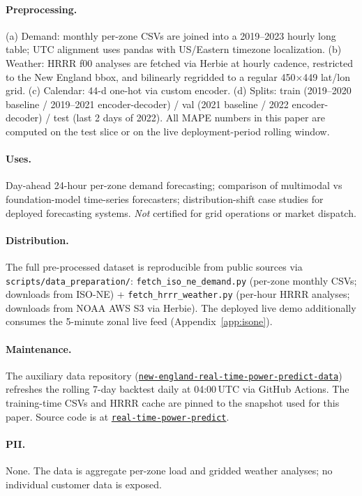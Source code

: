 \paragraph{Preprocessing.} (a) Demand: monthly per-zone CSVs are joined into a 2019--2023 hourly long table; UTC alignment uses pandas with US/Eastern timezone localization. (b) Weather: HRRR f00 analyses are fetched via Herbie at hourly cadence, restricted to the New England bbox, and bilinearly regridded to a regular 450$\times$449 lat/lon grid. (c) Calendar: 44-d one-hot via custom encoder. (d) Splits: train (2019--2020 baseline / 2019--2021 encoder-decoder) / val (2021 baseline / 2022 encoder-decoder) / test (last 2 days of 2022). All MAPE numbers in this paper are computed on the test slice or on the live deployment-period rolling window.

\paragraph{Uses.} Day-ahead 24-hour per-zone demand forecasting; comparison of multimodal vs foundation-model time-series forecasters; distribution-shift case studies for deployed forecasting systems. \emph{Not} certified for grid operations or market dispatch.

\paragraph{Distribution.} The full pre-processed dataset is reproducible from public sources via \texttt{scripts/data\_preparation/}: \texttt{fetch\_iso\_ne\_demand.py} (per-zone monthly CSVs; downloads from ISO-NE) + \texttt{fetch\_hrrr\_weather.py} (per-hour HRRR analyses; downloads from NOAA AWS S3 via Herbie). The deployed live demo additionally consumes the 5-minute zonal live feed (Appendix~\ref{app:isone}).

\paragraph{Maintenance.} The auxiliary data repository (\href{https://github.com/jeffliulab/new-england-real-time-power-predict-data}{\texttt{new-england-real-time-power-predict-data}}) refreshes the rolling 7-day backtest daily at 04:00\,UTC via GitHub Actions. The training-time CSVs and HRRR cache are pinned to the snapshot used for this paper. Source code is at \href{https://github.com/jeffliulab/real-time-power-predict}{\texttt{real-time-power-predict}}.

\paragraph{PII.} None. The data is aggregate per-zone load and gridded weather analyses; no individual customer data is exposed.
